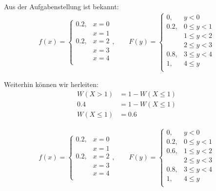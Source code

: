 \documentclass[11pt, a4paper]{article}
\newif\ifshowsolution
\begin{document}
\ifshowsolution
	Aus der Aufgabenstellung ist bekannt:
	\begin{align*}
		f(x) = 
		\begin{cases}
			0.2, & x = 0 \\
			& x = 1 \\
			0.2, & x = 2 \\
			& x = 3 \\
			& x = 4 \\
		\end{cases}, \qquad
		F(y) =
		\begin{cases}
			0, & y < 0 \\
			0.2, & 0 \leq y < 1 \\
			& 1 \leq y < 2 \\
			& 2 \leq y < 3 \\
			0.8, & 3 \leq y < 4 \\
			1, & 4 \leq y \\
		\end{cases}
	\end{align*}

	Weiterhin können wir herleiten:
	\begin{align*}
		W(X > 1) &= 1 - W(X \leq 1) \\
		0.4 &= 1 - W(X \leq 1) \\
		W(X \leq 1) &= 0.6
	\end{align*}

	\begin{align*}
		f(x) = 
		\begin{cases}
			0.2, & x = 0 \\
			& x = 1 \\
			0.2, & x = 2 \\
			& x = 3 \\
			& x = 4 \\
		\end{cases}, \qquad
		F(y) =
		\begin{cases}
			0, & y < 0 \\
			0.2, & 0 \leq y < 1 \\
			0.6, & 1 \leq y < 2 \\
			& 2 \leq y < 3 \\
			0.8, & 3 \leq y < 4 \\
			1, & 4 \leq y \\
		\end{cases}
	\end{align*}
\end{document}
